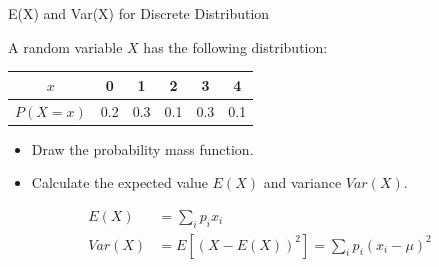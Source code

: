 \begin{frame}{E(X) and Var(X) for Discrete Distribution}
    \begin{example}
        \medskip
        A random variable $X$ has the following distribution:
    
        \begin{tabular}{c|c|c|c|c|c}
            $x$      & 0   & 1   & 2   & 3   & 4   \\
            \hline
            $P(X=x)$ & 0.2 & 0.3 & 0.1 & 0.3 & 0.1
        \end{tabular}
    
        \begin{itemize}
            \item Draw the probability mass function.
            \item Calculate the expected value $E(X)$ and variance $Var(X)$.
        \end{itemize}
        \begin{align*}
        E(X) &= \sum_{i} p_i x_i\\
        Var(X) &= E[(X-E(X))^2] = \sum_{i} p_i (x_i - \mu)^2
        \end{align*}
    \end{example}

\end{frame}

